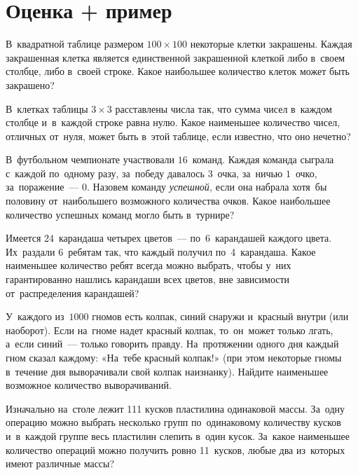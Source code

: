 

\section*{Оценка + пример}


\begin{problems}

\item
В~квадратной таблице размером $100 \times 100$ некоторые клетки закрашены.
Каждая закрашенная клетка является единственной закрашенной клеткой либо
в~своем столбце, либо в~своей строке.
Какое наибольшее количество клеток может быть закрашено?

\item
В~клетках таблицы $3 \times 3$ расставлены числа так, что сумма чисел в~каждом
столбце и~в~каждой строке равна нулю.
Какое наименьшее количество чисел, отличных от~нуля, может быть в~этой таблице,
если известно, что оно нечетно?

\item
В~футбольном чемпионате участвовали $16$~команд.
Каждая команда сыграла с~каждой по~одному разу, за~победу давалось $3$~очка,
за~ничью $1$~очко, за~поражение~— $0$.
Назовем команду \emph{успешной,} если она набрала хотя~бы половину
от~наибольшего возможного количества очков.
Какое наибольшее количество успешных команд могло быть в~турнире?

\item
Имеется 24~карандаша четырех цветов~— по~6~карандашей каждого цвета.
Их~раздали 6~ребятам так, что каждый получил по~4~карандаша.
Какое наименьшее количество ребят всегда можно выбрать, чтобы у~них
гарантированно нашлись карандаши всех цветов, вне зависимости от~распределения
карандашей?

\item
У~каждого из~$1000$ гномов есть колпак, синий снаружи и~красный внутри
(или наоборот).
Если на~гноме надет красный колпак, то~он~может только лгать, а~если синий~—
только говорить правду.
На~протяжении одного дня каждый гном сказал каждому:
«На~тебе красный колпак!»
(при этом некоторые гномы в~течение дня выворачивали свой колпак наизнанку).
Найдите наименьшее возможное количество выворачиваний.

\item
Изначально на~столе лежит 111 кусков пластилина одинаковой массы.
За~одну операцию можно выбрать несколько групп по~одинаковому количеству кусков
и~в~каждой группе весь пластилин слепить в~один кусок.
За~какое наименьшее количество операций можно получить ровно 11~кусков, любые
два из~которых имеют различные массы?


\end{problems}
